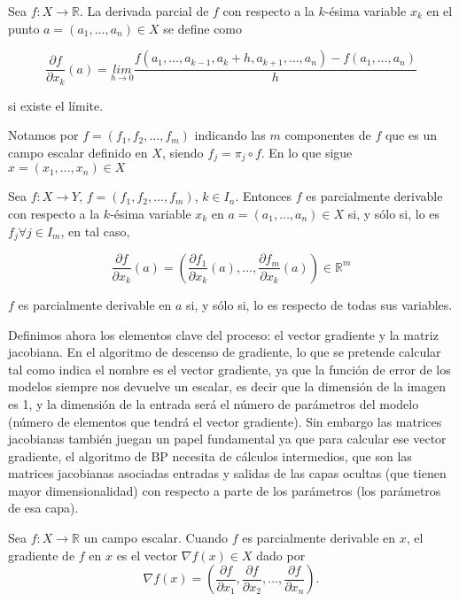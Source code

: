 \begin{definicion}
        Sea $f: X \rightarrow \mathbb{R}$. La derivada parcial de $f$ con respecto a la $k$-ésima variable $x_k$ en el punto $a = (a_1, \ldots, a_n)\in X$ se define como

	$$ \frac{\partial f}{\partial x_k}(a) = \underset{h\rightarrow0}{lim}\frac{f(a_1, \ldots, a_{k-1}, a_k + h, a_{k+1}, \ldots, a_n) - f(a_1, \ldots, a_n)}{h}$$

	si existe el límite.
\end{definicion}

Notamos por $f= \left ( f_1,f_2,\ldots, f_m \right )$ indicando las $m$ componentes de $f$ que es un campo escalar definido en $X$, siendo $f_j=\pi _j \circ f$.  En lo que sigue $x = \left ( x_1, \ldots, x_n  \right )  \in X$


\begin{definicion}
        Sea $f: X \rightarrow Y$,  $f=(f_1, f_2, \ldots, f_m)$, $k \in I_n$. Entonces $f$ es parcialmente derivable con respecto a la $k$-ésima variable $x_k$ en $a = (a_1, \ldots, a_n)\in X$ si, y sólo si, lo es $f_j \forall j \in I_m$, en tal caso, 

        $$\frac{\partial f}{\partial x_k}(a) = \left ( \frac{\partial f_1}{\partial x_k}(a), \ldots, \frac{\partial f_m}{\partial x_k}(a) \right ) \in \mathbb{R}^m$$

        $f$ es parcialmente derivable en $a$ si, y sólo si, lo es respecto de todas sus variables.
\end{definicion}


Definimos ahora los elementos clave del proceso: el vector gradiente y la matriz jacobiana. En el algoritmo de descenso de gradiente, lo que se pretende calcular tal como indica el nombre es el vector gradiente, ya que la función de error de los modelos siempre nos devuelve un escalar, es decir que la dimensión de la imagen es 1, y la dimensión de la entrada será el número de parámetros del modelo (número de elementos que tendrá el vector gradiente). Sin embargo las matrices jacobianas también juegan un papel fundamental ya que para calcular ese vector gradiente, el algoritmo de BP necesita de cálculos intermedios, que son las matrices jacobianas asociadas entradas y salidas de las capas ocultas (que tienen mayor dimensionalidad) con respecto a parte de los parámetros (los parámetros de esa capa).

\begin{definicion}
    Sea $f:X \rightarrow \mathbb{R}$ un campo escalar. Cuando $f$ es parcialmente derivable en $x$, el gradiente de $f$ en $x$ es el vector $\nabla f(x) \in X$ dado por 
    $$\nabla f(x) = \left ( \frac{\partial f}{\partial x_1}, \frac{\partial f}{\partial x_2}, \ldots, \frac{\partial f}{\partial x_n} \right ).$$
\end{definicion}


